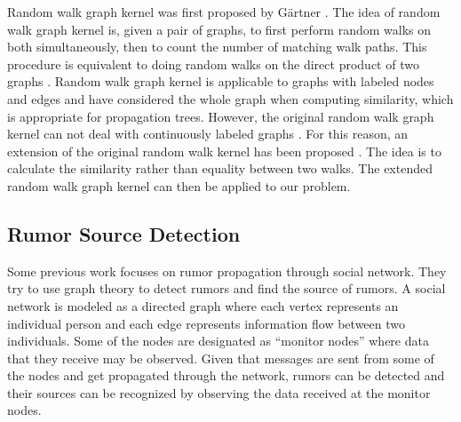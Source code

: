 Random walk graph kernel was first proposed by G{\"a}rtner
\cite{gartner2003graph}. The idea of random walk graph kernel is, given a
pair of graphs, to first perform random walks on both simultaneously,
then to count the number of matching walk paths.
This procedure is equivalent to
doing random walks on the direct product of two graphs
\cite{vishwanathan2010graph}. Random walk graph kernel is applicable to
graphs with labeled nodes and edges and have considered the whole graph
when computing similarity, which is appropriate for propagation trees.
However, the original random walk graph kernel can not deal with
continuously labeled graphs \cite{neuhaus2006random}. For this reason,
an extension of the original random walk kernel has been proposed
\cite{borgwardt2005protein}. The idea is to calculate the similarity
rather than equality between two walks.
The extended random walk graph kernel can then be applied to our problem.

\subsection{Rumor Source Detection}
Some previous work \cite{shah2011rumors,seo2012identifying}
focuses on rumor propagation through social network. They try to use
graph theory to detect rumors and find the source of rumors.
A social network is modeled as a directed graph where each vertex
represents an individual person and each edge represents information
flow between two individuals. Some of the nodes are designated as
``monitor nodes'' where data that they receive may be observed.
Given that messages are sent from some of the nodes and get propagated
through the network, rumors can be detected and their sources can be
recognized by observing the data received at the monitor nodes.



